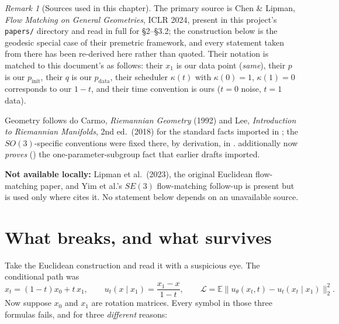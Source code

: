 \documentclass[11pt,a4paper]{report}
\theoremstyle{definition}
\theoremstyle{remark}
\newtheorem{remark}[remark]{Remark}
\newcommand{\EE}{\mathbb E}
\newcommand{\file}[1]{\texttt{#1}}
\begin{document}
\begin{remark}[Sources used in this chapter]
\label{rem:rfm-sources}
The primary source is Chen \& Lipman, \emph{Flow Matching on General
Geometries}, ICLR 2024, present in this project's \file{papers/} directory
and read in full for \S2--\S3.2; the construction below is the geodesic
special case of their premetric framework, and every statement taken from
there has been re-derived here rather than quoted. Their notation is
matched to this document's as follows: their $x_1$ is our data point
(\emph{same}), their $p$ is our $p_{\mathrm{init}}$, their $q$ is our
$p_{\mathrm{data}}$, their scheduler $\kappa(t)$ with $\kappa(0)=1$,
$\kappa(1)=0$ corresponds to our $1-t$, and their time convention is ours
($t=0$ noise, $t=1$ data).

Geometry follows do Carmo, \emph{Riemannian Geometry} (1992) and Lee,
\emph{Introduction to Riemannian Manifolds}, 2nd ed.\ (2018) for the
standard facts imported in ; the $SO(3)$-specific
conventions were fixed there, by derivation, in
.  additionally now
\emph{proves} () the one-parameter-subgroup
fact that earlier drafts imported.

\textbf{Not available locally:} Lipman et al.\ (2023), the original
Euclidean flow-matching paper, and Yim et al.'s $SE(3)$ flow-matching
follow-up is present but is used only where  cites it.
No statement below depends on an unavailable source.
\end{remark}

\section{What breaks, and what survives}
\label{sec:rfm-what-breaks}

Take the Euclidean construction and read it with a suspicious eye. The
conditional path was
\[
x_t = (1-t)x_0 + t\,x_1 ,
\qquad
u_t(x\mid x_1) = \frac{x_1-x}{1-t} ,
\qquad
\mathcal L = \EE\bigl\|u_\theta(x_t,t)-u_t(x_t\mid x_1)\bigr\|_2^2 .
\]
Now suppose $x_0$ and $x_1$ are rotation matrices. Every symbol in those
three formulas fails, and for three \emph{different} reasons:
\end{document}
